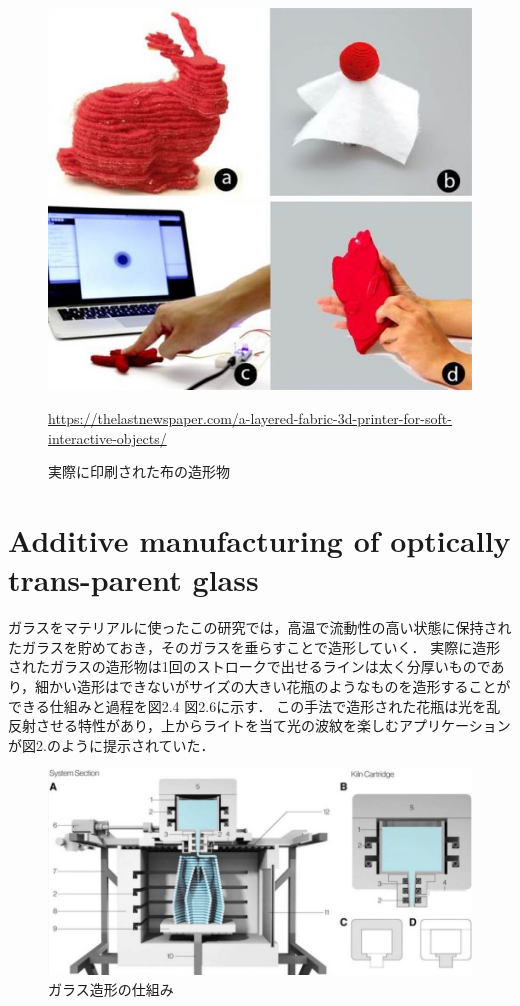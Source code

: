 \begin{figure}[H]
  \centering
  \includegraphics[width=10truecm]{./fig/ALayered.jpg}
  \caption{実際に印刷された布の造形物}
  \url{https://thelastnewspaper.com/a-layered-fabric-3d-printer-for-soft-interactive-objects/} %
  \label{fig:ferret}
\end{figure}



\section{ Additive manufacturing of optically trans-parent glass\cite{d}}
\label{sec:enum}
ガラスをマテリアルに使ったこの研究では，高温で流動性の高い状態に保持されたガラスを貯めておき，そのガラスを垂らすことで造形していく．
実際に造形されたガラスの造形物は1回のストロークで出せるラインは太く分厚いものであり，細かい造形はできないがサイズの大きい花瓶のようなものを造形することができる仕組みと過程を図2.4 図2.6に示す．
この手法で造形された花瓶は光を乱反射させる特性があり，上からライトを当て光の波紋を楽しむアプリケーションが図2.のように提示されていた．

\begin{figure}[H]
  \centering
  \includegraphics[width=12.5truecm]{./fig/Additive2.jpg}
  \caption{ガラス造形の仕組み}
  \label{fig:ferret}
\end{figure}

